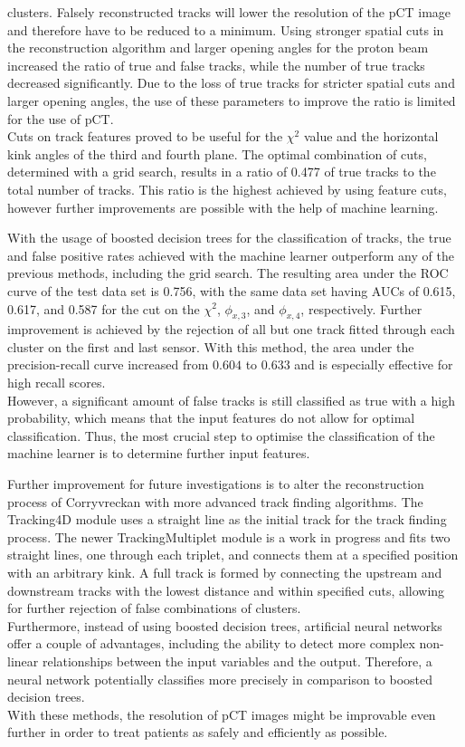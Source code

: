 clusters. Falsely reconstructed tracks will lower the resolution of the pCT image and therefore have to be reduced to a minimum. Using stronger spatial cuts
in the reconstruction algorithm and larger
opening angles for the proton beam increased the ratio of true and false tracks, while the number of true tracks decreased significantly. Due to the loss of
true tracks for stricter spatial cuts and larger opening angles, the use of these parameters to improve the ratio is limited for the use of pCT. \\
Cuts on track features proved to be useful for the $\chi^2$ value and the horizontal kink angles of the third and fourth plane.
The optimal combination of cuts, determined
with a grid search, results in a ratio of 0.477 of true tracks to the total number of tracks.
This ratio is the highest achieved by using feature cuts, however further improvements are possible
with the help of machine learning.

With the usage of boosted decision trees for the classification of tracks, the true and false positive rates achieved with the machine learner outperform any of the previous methods, including the grid search.
The resulting area under the ROC curve of the test data set is 0.756, with the same data set having AUCs of
0.615, 0.617, and 0.587 for the cut on the $\chi^2$, $\phi_{x,3}$, and $\phi_{x,4}$, respectively. Further improvement is achieved by the rejection of all but one track
fitted through each cluster on the first and last sensor.
With this method, the area under the precision-recall curve increased from $0.604$ to $0.633$ and is especially
effective for high recall scores. \\
However, a significant amount of false tracks is still classified as true
with a high probability, which means that the input features do not allow for optimal classification.
Thus, the most crucial step to optimise the classification of the machine learner is to determine further input features.

Further improvement for future investigations
is to alter the reconstruction process of Corryvreckan with more advanced track finding algorithms.
The Tracking4D module uses a straight line as the initial track for
the track finding process. The newer TrackingMultiplet module is a work in progress and fits two straight lines,
one through each triplet, and connects them at a specified position with an arbitrary kink.
A full track is formed by connecting the upstream and downstream tracks with the lowest distance and within specified cuts,
allowing for further rejection of false combinations of clusters. \\
Furthermore, instead of using boosted decision trees, artificial neural networks \cite{ann} offer a couple of advantages,
including the ability to detect more complex non-linear relationships between the input variables and the output. Therefore, a neural network potentially classifies
more precisely in comparison to boosted decision trees. \\
With these methods, the resolution of pCT images might be improvable even further in order to treat patients as safely and efficiently as possible.
